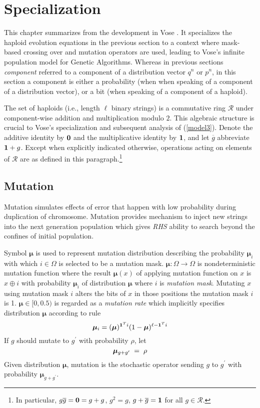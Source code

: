 \chapter{Specialization}\label{ch:specialize}
This chapter summarizes from the development in Vose \cite{Vose1999}.
It specializes the haploid evolution equations in the previous section 
to a context where mask-based crossing over and mutation operators are used, 
leading to Vose's infinite population model for Genetic Algorithms.  Whereas 
in previous sections {\em component} referred to a component
of a distribution vector $q^n$ or $p^n$, in this section a component
is either a probability (when when speaking of a component of a
distribution vector), or a bit (when speaking of a component of a
haploid).

The set of haploids (i.e., length $\ell$ binary strings) is a
commutative ring $\mathcal{R}$ under component-wise addition and
multiplication modulo $2$.  This algebraic structure is crucial to
Vose's specialization and subsequent analysis of
(\ref{model3}). Denote the additive identity by ${\bf 0}$ and the
multiplicative identity by ${\bf 1}$, and let $\overline{g}$
abbreviate ${\bf 1} + g$.  Except when explicitly indicated otherwise,
operations acting on elements of $\mathcal{R}$ are as defined in this
paragraph.\footnote{In particular, $g \overline{g} = {\bf 0} = g+g$,
  $g^2 = g$, $g + \overline{g} = {\bf 1}$ for all $g \in
  \mathcal{R}$.}

\section{Mutation}
Mutation simulates effects of error that happen with low probability during duplication of chromosome. Mutation provides mechanism to inject new strings into the next generation population which gives {\em RHS} ability to search beyond the confines of initial population.

Symbol $\bm{\mu}$ is used to represent mutation distribution describing the probability $\bm{\mu}_i$ with which $i \in \Omega$ is selected to be a mutation mask. $\bm{\mu} : \Omega \rightarrow \Omega$ is nondeterministic mutation function where the result $\bm{\mu}(x)$ of applying mutation function on $x$ is $x \oplus i$ with probability $\bm{\mu}_i$ of distribution $\bm{\mu}$ where $i$ is {\em mutation mask}. Mutating $x$ using mutation mask $i$ alters the bits of $x$ in those positions the mutation mask $i$ is 1.
$\bm{\mu} \in [0, 0.5)$ is regarded as a {\em mutation rate} which implicitly specifies distribution $\bm{\mu}$ according to rule \cite{VoseWright1998}
\[
\bm{\mu}_i = (\bm{\mu})^{{\bf 1}^Ti} (1-\bm{\mu})^{\ell- {\bf 1}^Ti}
\]
If $g$ should mutate to $g^\prime$ with probability $\rho$,
let\\[-0.2in]
\[
\bm{\mu}_{g + g^\prime} \; = \; \rho\\[0.05in]
\]
Given distribution $\bm{\mu}$, mutation is the stochastic operator sending
$g$ to $g^\prime$ with probability $\bm{\mu}_{g + g^\prime}$.

